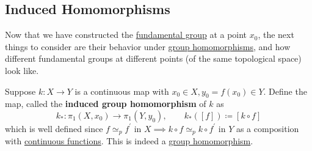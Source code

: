 \subsection{Induced Homomorphisms}

  Now that we have constructed the \hyperref[def:fundamental-group]{fundamental group} at a point $x_0$, the next things to consider are their behavior under \hyperref[alg-def:group-homomorphism]{group homomorphisms}, and how different fundamental groups at different points (of the same topological space) look like. 

  \begin{definition}
    \label{def:induced-group-homomorphism}
    Suppose $k: X \to Y$ is a continuous map with $x_0 \in X, y_0 = f(x_0) \in Y$. Define the map, called the \textbf{induced group homomorphism} of $k$ as 
    \begin{equation}
      k_\ast : \pi_1 (X, x_0) \to \pi_1 (Y, y_0), \qquad k_\ast ([f]) \coloneqq [k \circ f] 
    \end{equation}
    which is well defined since $f \simeq_p f^\prime$ in $X \implies k \circ f \simeq_p k \circ f^\prime$ in $Y$ as a composition with \hyperref[pst-def:continuous_func]{continuous functions}. This is indeed a \hyperref[alg-def:group-homomorphism]{group homomorphism}. 
  \end{definition}
